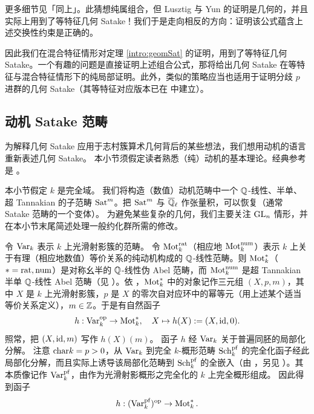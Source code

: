 更多细节见「同上」。此猜想纯属组合，但 Lusztig 与 Yun \cite{LY} 的证明是几何的，并且实际上用到了等特征几何 Satake！我们于是走向相反的方向：证明该公式蕴含上述交换性约束是正确的。

因此我们在混合特征情形对定理 \ref{intro:geomSat} 的证明，用到了等特征几何 Satake。一个有趣的问题是直接证明上述组合公式，那将给出几何 Satake 在等特征与混合特征情形下的纯局部证明。此外，类似的策略应当也适用于证明分歧 $p$ 进群的几何 Satake（其等特征对应版本已在 \cite{Zh0, Ri} 中建立）。


\subsection{动机 Satake 范畴}
\label{SS: MotSat}
为解释几何 Satake 应用于志村簇算术几何背后的某些想法，我们想用动机的语言重新表述几何 Satake。
本小节须假定读者熟悉（纯）动机的基本理论。经典参考是 \cite{Kl}。

本小节假定 $k$ 是完全域。
我们将构造（数值）动机范畴中一个 ${\mathbb Q}$-线性、半单、超 Tannakian 的子范畴 $\operatorname{Sat}^m$。把 $\operatorname{Sat}^m$ 与 ${\overline{{\mathbb Q}}_\ell}$ 作张量积，可以恢复（通常 Satake 范畴的一个变体）。
为避免某些复杂的几何，我们主要关注 ${\operatorname{GL}}_n$ 情形，并在本小节末尾简述处理一般约化群所需的修改。



令 $\operatorname{Var}_k$ 表示 $k$ 上光滑射影簇的范畴。
令 $\operatorname{Mot}^{\operatorname{rat}}_k$（相应地 $\operatorname{Mot}_k^{\operatorname{num}}$）表示 $k$ 上关于有理（相应地数值）等价关系的纯动机构成的 ${\mathbb Q}$-线性范畴。则 $\operatorname{Mot}_k^*$（$*=\operatorname{rat},\operatorname{num}$）是对称幺半的 ${\mathbb Q}$-线性伪 Abel 范畴，而 $\operatorname{Mot}_k^{\operatorname{num}}$ 是超 Tannakian 半单 ${\mathbb Q}$-线性 Abel 范畴（见 \cite{Ja}）。依 \cite{Ja}，$\operatorname{Mot}_k^{*}$ 中的对象记作三元组 $(X,p,m)$，其中 $X$ 是 $k$ 上光滑射影簇，$p$ 是 $X$ 的零次自对应环中的幂等元（用上述某个适当等价关系定义），$m\in{\mathbb Z}$。于是有自然函子
\[h:\operatorname{Var}_k^{\operatorname{op}}\to \operatorname{Mot}^*_k,\quad X\mapsto h(X):=(X,{\operatorname{id}},0).\]
照常，把 $(X,{\operatorname{id}},m)$ 写作 $h(X)(m)$。
函子 $h$ 经 $\operatorname{Var}_k$ 关于普遍同胚的局部化分解。
注意 ${\operatorname{char}} k=p>0$，从 $\operatorname{Var}_k$ 到完全 $k$-概形范畴 $\operatorname{Sch}_k^{\operatorname{pf}}$ 的完全化函子经此局部化分解，而且实际上诱导该局部化范畴到 $\operatorname{Sch}_k^{\operatorname{pf}}$ 的全嵌入（由 \cite[推论 A.16、命题 A.17]{Zh1}，另见 \cite[引理 3.8、命题 3.11]{BS}）。其本质像记作 $\operatorname{Var}^{\operatorname{pf}}_k$，由作为光滑射影概形之完全化的 $k$ 上完全概形组成。
因此得到函子
$$h:(\operatorname{Var}^{\operatorname{pf}}_k)^{\operatorname{op}}\to\operatorname{Mot}^*_k.$$

